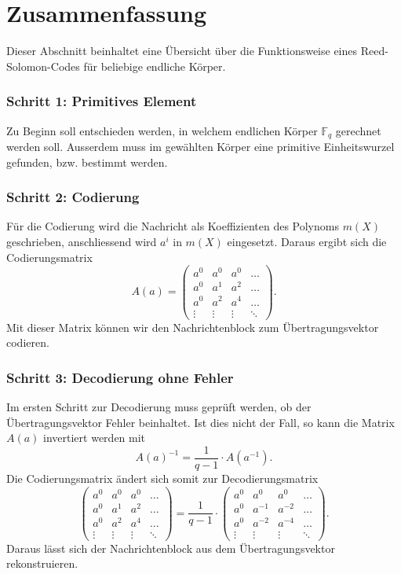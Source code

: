 %
%
%
\section{Zusammenfassung
\label{reedsolomon:section:zf}}
%
%
Dieser Abschnitt beinhaltet eine Übersicht über die Funktionsweise eines Reed-Solomon-Codes für beliebige endliche Körper.

\subsubsection{Schritt 1: Primitives Element}
Zu Beginn soll entschieden werden, in welchem endlichen Körper $\mathbb{F}_{q}$ gerechnet werden soll. 
Ausserdem muss im gewählten Körper eine primitive Einheitswurzel gefunden, bzw. bestimmt werden. 

\subsubsection{Schritt 2: Codierung}
Für die Codierung wird die Nachricht als Koeffizienten des Polynoms $m(X)$ geschrieben, anschliessend wird $a^i$ in $m(X)$ eingesetzt. 
Daraus ergibt sich die Codierungsmatrix
\[
A(a) = 
\begin{pmatrix}
a^0 & a^0 & a^0 & \dots \\
a^0 & a^1 & a^2 & \dots \\
a^0 & a^2 & a^4 & \dots \\
\vdots&\vdots&\vdots&\ddots
\end{pmatrix}
.
\]
Mit dieser Matrix können wir den Nachrichtenblock zum Übertragungsvektor codieren. 

\subsubsection{Schritt 3: Decodierung ohne Fehler}
Im ersten Schritt zur Decodierung muss geprüft werden, ob der Übertragungsvektor Fehler beinhaltet.
Ist dies nicht der Fall, so kann die Matrix $A(a)$ invertiert werden mit
\[
A(a)^{-1} = \frac{1}{q-1} \cdot A(a^{-1}).
\]
Die Codierungsmatrix ändert sich somit zur Decodierungsmatrix
\[
\begin{pmatrix}
	a^0 & a^0 & a^0 & \dots \\
	a^0 & a^1 & a^2 & \dots \\
	a^0 & a^2 & a^4 & \dots \\
	\vdots&\vdots&\vdots &\ddots
\end{pmatrix}
= 
\frac{1}{q-1}
\cdot
\begin{pmatrix}
	a^0 & a^0 & a^0 & \dots \\
	a^0 & a^{-1} & a^{-2} & \dots \\
	a^0 & a^{-2} & a^{-4} & \dots \\
	\vdots&\vdots&\vdots&\ddots
\end{pmatrix}
.
\]
Daraus lässt sich der Nachrichtenblock aus dem Übertragungsvektor rekonstruieren.

